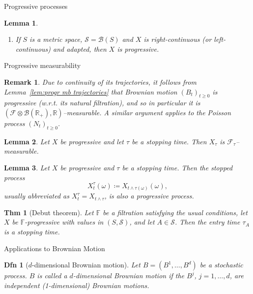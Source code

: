 \documentclass[a4paper]{article}
\theoremstyle{mytheoremstyle}
\newtheorem{definition}{Dfn}
\newtheorem{theorem}{Thm}
\newtheorem{lemma}{Lemma}
\newtheorem*{remark}{Remark}
\newcommand{\1}{\mathds{1}}
\begin{document}
\begin{multicols*}{3}
\begin{roundbox}{Progressive processes}
\begin{lemma}
\begin{enumerate}
    \item If $S$ is a metric space, $\mathcal{S}=\mathcal{B} (S)$ and $X$ is
    right-continuous (or left-continuous) and adapted, then $X$ is
    progressive.
  \end{enumerate}
\end{lemma}
\end{roundbox}

\begin{roundbox}{Progressive measurability}
\begin{remark}
  Due to continuity of its trajectories, it follows from
  Lemma~\ref{lem:progr mb trajectories} that Brownian motion $(B_t)_{t
  \geqslant 0}$ is progressive (w.r.t. its natural filtration), and so in
  particular it is $(\mathcal{F} \otimes \mathcal{B}(\mathbb{R}_+),
  \mathbb{R})$--measurable. A similar argument applies to the Poisson process
  $(N_t)_{t \geqslant 0}$.
\end{remark}

\begin{lemma}
  \label{lem:progressively measurable in stopping time}Let $X$ be progressive
  and let $\tau$ be a stopping time. Then $X_{\tau}$ is
  $\mathcal{F}_{\tau}$--measurable.
\end{lemma}

\begin{lemma}
  Let $X$ be progressive and $\tau$ be a stopping time. Then the
  {\emph{stopped process}}
  \[ X^{\tau}_t (\omega) \coloneq X_{t \wedge \tau (\omega)} (\omega), \]
  usually abbreviated as $X^{\tau}_t = X_{t \wedge \tau}$, is also a
  progressive process.
\end{lemma}

\begin{theorem}[Debut theorem]
  \label{thm:Debut theorem}Let $\mathbb{F}$ be a filtration satisfying the
  usual conditions, let $X$ be $\mathbb{F}$-progressive with values in $(S,
  \mathcal{S})$, and let $A \in \mathcal{S}$. Then the entry time $\tau_A$ is
  a stopping time.
\end{theorem}
\end{roundbox}


\begin{roundbox}{Applications to Brownian Motion}
\begin{definition}[$d$-dimensional Brownian motion]
  Let $B = (B^1, \ldots, B^d)$ be a stochastic process. $B$ is called a
  {\emph{$d$-dimensional Brownian motion}} if the $B^j$, $j = 1, \ldots, d$,
  are independent (1-dimensional) Brownian motions.
\end{definition}


\end{roundbox}
\end{multicols*}
\end{document}

